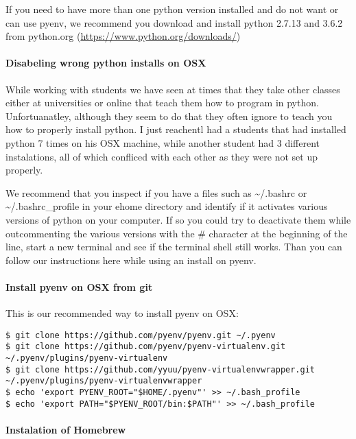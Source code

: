 If you need to have more than one python version installed and do not
want or can use pyenv, we recommend you download and install python
2.7.13 and 3.6.2 from python.org
(\url{https://www.python.org/downloads/})

\paragraph{Disabeling wrong python installs on
OSX}\label{disabeling-wrong-python-installs-on-osx}

While working with students we have seen at times that they take other
classes either at universities or online that teach them how to program
in python. Unfortuanatley, although they seem to do that they often
ignore to teach you how to properly install python. I just reachentl had
a students that had installed python 7 times on his OSX machine, while
another student had 3 different instalations, all of which confliced
with each other as they were not set up properly.

We recommend that you inspect if you have a files such as
\textasciitilde{}/.bashrc or \textasciitilde{}/.bashrc\_profile in your
ehome directory and identify if it activates various versions of python
on your computer. If so you could try to deactivate them while
outcommenting the various versions with the \# character at the
beginning of the line, start a new terminal and see if the terminal
shell still works. Than you can follow our instructions here while using
an install on pyenv.

\paragraph{Install pyenv on OSX from
git}\label{install-pyenv-on-osx-from-git}

This is our recommended way to install pyenv on OSX:

\begin{verbatim}
$ git clone https://github.com/pyenv/pyenv.git ~/.pyenv
$ git clone https://github.com/pyenv/pyenv-virtualenv.git ~/.pyenv/plugins/pyenv-virtualenv
$ git clone https://github.com/yyuu/pyenv-virtualenvwrapper.git ~/.pyenv/plugins/pyenv-virtualenvwrapper
$ echo 'export PYENV_ROOT="$HOME/.pyenv"' >> ~/.bash_profile
$ echo 'export PATH="$PYENV_ROOT/bin:$PATH"' >> ~/.bash_profile
\end{verbatim}

\paragraph{Instalation of Homebrew}\label{instalation-of-homebrew}

